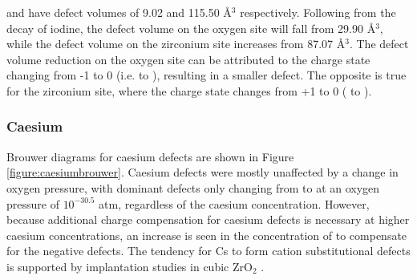  and  have defect volumes of 9.02 and 115.50 \r{A}$^{3}$ respectively. Following from the decay of iodine, the defect volume on the oxygen site will fall from 29.90 \r{A}$^{3}$, while the defect volume on the zirconium site increases from 87.07 \r{A}$^{3}$. The defect volume reduction on the oxygen site can be attributed to the charge state changing from -1 to 0 (i.e.  to ), resulting in a smaller defect. The opposite is true for the zirconium site, where the charge state changes from +1 to 0 ( to ).


\subsubsection{Caesium}

Brouwer diagrams for caesium defects are shown in Figure \ref{figure:caesiumbrouwer}. Caesium defects were mostly unaffected by a change in oxygen pressure, with dominant defects only changing from  to  at an oxygen pressure of $10^{-30.5}$ atm, regardless of the caesium concentration. However, because additional charge compensation for caesium defects is necessary at higher caesium concentrations, an increase is seen in the concentration of  to compensate for the negative  defects. The tendency for Cs to form cation substitutional defects is supported by implantation studies in cubic ZrO$_{2}$ \cite{Thome1999}.

